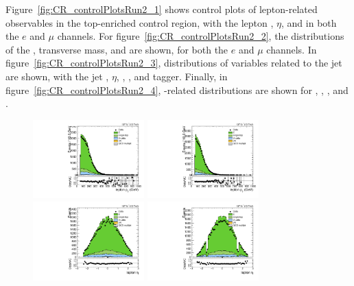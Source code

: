 Figure~\ref{fig:CR_controlPlotsRun2_1} shows control plots of lepton-related observables in the top-enriched control region, with the lepton \pt, $\eta$, and \Etmiss in both the $e$ and $\mu$ channels.
For figure~\ref{fig:CR_controlPlotsRun2_2}, the distributions of the \Wlep \pt, transverse mass, and \MVV are shown, for both the $e$ and $\mu$ channels.
In figure~\ref{fig:CR_controlPlotsRun2_3}, distributions of variables related to the \Vhad jet are shown, with the jet \pt, $\eta$, \MJ, \nsubjDDT, and \DoubleB tagger.
Finally, in figure~\ref{fig:CR_controlPlotsRun2_4}, \VBF-related distributions are shown for \DetaVBF, \mjjVBF, \nJets, and \Dy.

\begin{figure}[htbp]
  \centering
  \includegraphics[width=0.3825\textwidth]{fig/controlPlots/CR_b1_mu_allP_allC_allD_Run2_lnujj_l1_l_pt.pdf}
  \includegraphics[width=0.3825\textwidth]{fig/controlPlots/CR_b1_e_allP_allC_allD_Run2_lnujj_l1_l_pt.pdf}\\
  \includegraphics[width=0.3825\textwidth]{fig/controlPlots/CR_b1_mu_allP_allC_allD_Run2_lnujj_l1_l_eta.pdf}
  \includegraphics[width=0.3825\textwidth]{fig/controlPlots/CR_b1_e_allP_allC_allD_Run2_lnujj_l1_l_eta.pdf}\\

\end{figure}
